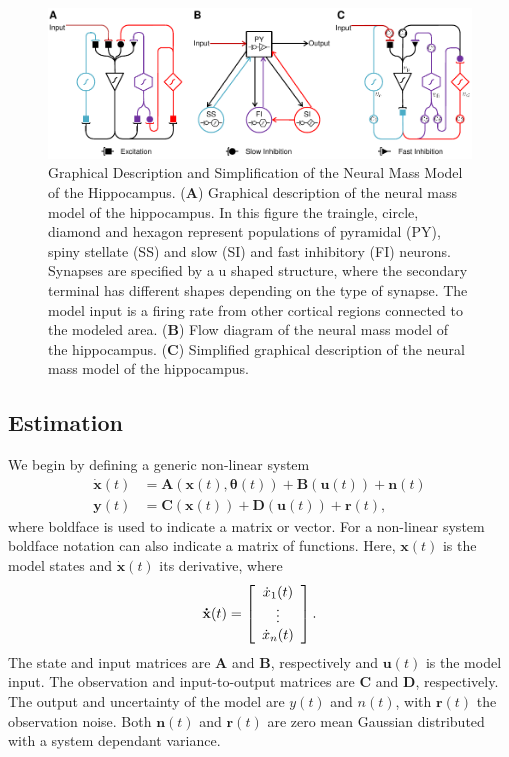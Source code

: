 \begin{figure}
 	\centering
 		\includegraphics{fig/Biological_Model.pdf}
 	\caption{Graphical Description and Simplification of the Neural Mass Model of the Hippocampus. (\textbf{A}) Graphical description of the neural mass model of the hippocampus. In this figure the traingle, circle, diamond and hexagon represent populations of pyramidal (PY), spiny stellate (SS) and slow (SI) and fast inhibitory (FI) neurons. Synapses are specified by a u shaped structure, where the secondary terminal has different shapes depending on the type of synapse. The model input is a firing rate from other cortical regions connected to the modeled area. (\textbf{B}) Flow diagram of the neural mass model of the hippocampus. (\textbf{C}) Simplified graphical description of the neural mass model of the hippocampus.}
 	\label{fig: Biological}
 \end{figure}


\subsection{Estimation}


We begin by defining a generic non-linear system\begin{align}
\label{eqn: NonlinEstS}
\mathbf{\dot{x}}(t) &= \mathbf{A}(\mathbf{x}(t),\mathbf{\theta}(t)) + \mathbf{B}(\mathbf{u}(t)) + \mathbf{n}(t)\\
\label{eqn: NonlinEstO}
\mathbf{y}(t)  &= \mathbf{C}(\mathbf{x}(t)) +\mathbf{D}(\mathbf{u}(t))+\mathbf{r}(t),
\end{align} where boldface is used to indicate a matrix or vector. For a non-linear system boldface notation can also indicate a matrix of functions. Here, $\mathbf{x}(t)$ is the model states and $\dot{\mathbf{x}}(t)$ its derivative, where
\[ \mathbf{\dot{x}}(t) = \left[ \begin{array}[pos]{c}
\dot{x}_{1}(t)\\
\vdots \\
\dot{x}_{n}(t) \end{array} \right] .\] The state and input matrices are $\mathbf{A}$ and $\mathbf{B}$, respectively and $\mathbf{u}(t)$ is the model input. The observation and input-to-output matrices are $\mathbf{C}$ and $\mathbf{D}$, respectively. The output and uncertainty of the model are $y(t)$ and $n(t)$, with $\mathbf{r}(t)$ the observation noise. Both $\mathbf{n}(t)$ and $\mathbf{r}(t)$ are zero mean Gaussian distributed with a system dependant variance. 


